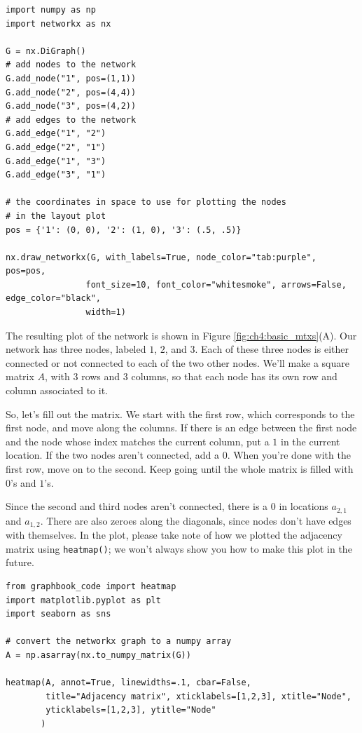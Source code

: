 \begin{lstlisting}[style=python]
import numpy as np
import networkx as nx

G = nx.DiGraph()
# add nodes to the network
G.add_node("1", pos=(1,1))
G.add_node("2", pos=(4,4))
G.add_node("3", pos=(4,2))
# add edges to the network
G.add_edge("1", "2")
G.add_edge("2", "1")
G.add_edge("1", "3")
G.add_edge("3", "1")

# the coordinates in space to use for plotting the nodes
# in the layout plot
pos = {'1': (0, 0), '2': (1, 0), '3': (.5, .5)}

nx.draw_networkx(G, with_labels=True, node_color="tab:purple", pos=pos,
                font_size=10, font_color="whitesmoke", arrows=False, edge_color="black",
                width=1)
\end{lstlisting}

The resulting plot of the network is shown in Figure \ref{fig:ch4:basic_mtxs}(A). Our network has three nodes, labeled $1$, $2$, and $3$. Each of these three nodes is either connected or not connected to each of the two other nodes. We'll make a square matrix $A$, with 3 rows and 3 columns, so that each node has its own row and column associated to it.

So, let's fill out the matrix. We start with the first row, which corresponds to the first node, and move along the columns. If there is an edge between the first node and the node whose index matches the current column, put a $1$ in the current location. If the two nodes aren't connected, add a $0$. When you're done with the first row, move on to the second. Keep going until the whole matrix is filled with $0$'s and $1$'s. 

Since the second and third nodes aren't connected, there is a $0$ in locations $a_{2, 1}$ and $a_{1, 2}$. There are also zeroes along the diagonals, since nodes don't have edges with themselves. In the plot, please take note of how we plotted the adjacency matrix using \texttt{heatmap()}; we won't always show you how to make this plot in the future. 

\begin{lstlisting}[style=python]
from graphbook_code import heatmap
import matplotlib.pyplot as plt
import seaborn as sns

# convert the networkx graph to a numpy array
A = np.asarray(nx.to_numpy_matrix(G))

heatmap(A, annot=True, linewidths=.1, cbar=False, 
        title="Adjacency matrix", xticklabels=[1,2,3], xtitle="Node", 
        yticklabels=[1,2,3], ytitle="Node"
       )


\end{lstlisting}

